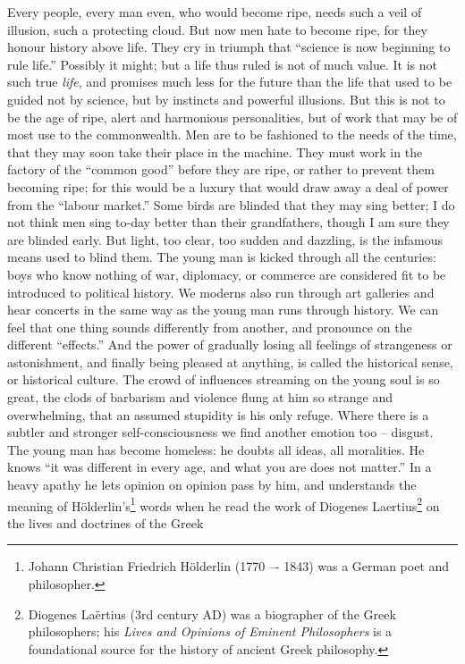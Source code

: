 Every people, every man even, who would become ripe, needs such a
veil of illusion, such a protecting cloud. But now men hate to become
ripe, for they honour history above life. They cry in triumph that
\enquote{science is now beginning to rule life.} Possibly it might; but a
life thus ruled is not of much value. It is not such true \textit{life}, and
promises much less for the future than the life that used to be
guided not by science, but by instincts and powerful illusions. But
this is not to be the age of ripe, alert and harmonious
personalities, but of work that may be of most use to the
commonwealth. Men are to be fashioned to the needs of the time, that
they may soon take their place in the machine. They must work in the
factory of the \enquote{common good} before they are ripe, or rather to
prevent them becoming ripe; for this would be a luxury that would
draw away a deal of power from the \enquote{labour market.} Some birds are
blinded that they may sing better; I do not think men sing to-day
better than their grandfathers, though I am sure they are blinded
early. But light, too clear, too sudden and dazzling, is the infamous
means used to blind them. The young man is kicked through all the
centuries: boys who know nothing of war, diplomacy, or commerce are
considered fit to be introduced to political history. We moderns also
run through art galleries and hear concerts in the same way as the
young man runs through history. We can feel that one thing sounds
differently from another, and pronounce on the different \enquote{effects.}
And the power of gradually losing all feelings of strangeness or
astonishment, and finally being pleased at anything, is called the
historical sense, or historical culture. The crowd of influences
streaming on the young soul is so great, the clods of barbarism and
violence flung at him so strange and overwhelming, that an assumed
stupidity is his only refuge. Where there is a subtler and stronger
self-consciousness we find another emotion too -- disgust. The young
man has become homeless: he doubts all ideas, all moralities. He
knows \enquote{it was different in every age, and what you are does not
matter.} In a heavy apathy he lets opinion on opinion pass by him,
and understands the meaning of Hölderlin's\footnote{Johann Christian Friedrich Hölderlin (1770 –- 1843) was a German poet and philosopher.} words when he read the
work of Diogenes Laertius\footnote{Diogenes Laërtius (3rd century AD) was a biographer of the Greek philosophers; his \textit{Lives and Opinions of Eminent Philosophers} is a foundational source for the history of ancient Greek philosophy.} on the lives and doctrines of the Greek
